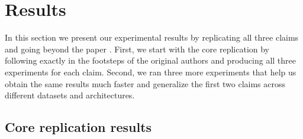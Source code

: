 \section{Results}
\label{sec:Results}
In this section we present our experimental results by replicating all three claims and going beyond the paper \citep{summers2021nondeterminism}. First, we start with the core replication by following exactly in the footsteps of the original authors and producing all three experiments for each claim. Second, we ran three more experiments that help us obtain the same results much faster and generalize the first two claims across different datasets and architectures.


\subsection{Core replication results}
